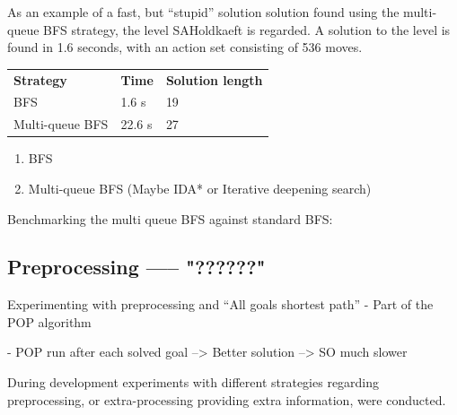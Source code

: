 \documentclass[Main]{subfiles}
\begin{document}
As an example of a fast, but ``stupid'' solution solution found using the multi-queue BFS strategy, the level SAHoldkaeft is regarded. A solution to the level is found in 1.6 seconds, with an action set consisting of 536 moves. 

\begin{table}[h]
\begin{tabular}{lll}
\rowcolor{grayish}
\textbf{Strategy} & \textbf{Time} & \textbf{Solution length} \\   %
BFS             & 1.6 s        & 19                       \\    %
Multi-queue BFS & 22.6 s       & 27                       %
\end{tabular}
\end{table}






\begin{enumerate}
    \item BFS 
    \item Multi-queue BFS (Maybe IDA* or Iterative deepening search)
\end{enumerate}



Benchmarking the multi queue BFS against standard BFS:





\subsection{Preprocessing ----- "??????" }

Experimenting with preprocessing and ``All goals shortest path'' 
- Part of the POP algorithm

- POP run after each solved goal 
--> Better solution --> SO much slower


During development experiments with different strategies regarding preprocessing, or extra-processing providing extra information, were conducted. 
\end{document}
